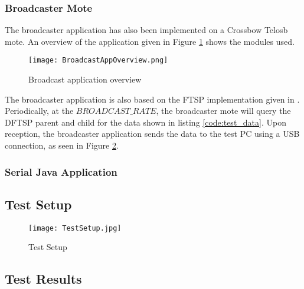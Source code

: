 \documentclass[Main]{subfiles}
\begin{document}
		
		\subsubsection{Broadcaster Mote} %
		\label{sub:broadcaster_mote}
			The broadcaster application has also been implemented on a Crossbow Telosb mote. 
			An overview of the application given in Figure \ref{fig:broadCastAppOverview} shows the modules used. 

			\begin{figure}[H]
				\centering
				\texttt{[image: BroadcastAppOverview.png]}
				\caption{Broadcast application overview}
				\label{fig:broadCastAppOverview}
			\end{figure}

			The broadcaster application is also based on the FTSP implementation given in \cite{FTSPImplementationTinyOS:Online}.	
			Periodically, at the $BROADCAST\_RATE$, the broadcaster mote will query the DFTSP parent and child for the data shown in listing \ref{code:test_data}.
			Upon reception, the broadcaster application sends the data to the test PC using a USB connection, as seen in Figure \ref{fig:TestSetup}.

	

		
		\subsubsection{Serial Java Application} %
		\label{sub:serial_java_application}
		


	\subsection{Test Setup} %
	\label{sub:test_setup}

		\begin{figure}[H]
			\centering
			\texttt{[image: TestSetup.jpg]}
			\caption{Test Setup}
			\label{fig:TestSetup}
		\end{figure}
	

	\subsection{Test Results} %
	\label{sub:test_results}
\end{document}
